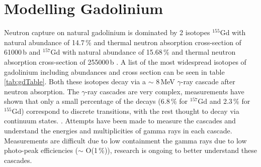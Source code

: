 \section{Modelling Gadolinium}\label{sec:GEANT4Simulation_modellingGadolinium}
Neutron capture on natural gadolinium is dominated by 2 isotopes $^{155}$Gd with natural abundance of 14.7\,\% and thermal neutron absorption cross-section of 61000\,b and $^{157}$Gd with natural abundance of 15.68\,\% and thermal neutron absorption cross-section of 255000\,b \cite{Abdushukurov_2010}. A list of the most widespread isotopes of gadolinium including abundances and cross section can be seen in table \ref{tab:gdTable}. Both these isotopes decay via a $\sim$ 8\,MeV $\gamma$-ray cascade after neutron absorption. The $\gamma$-ray cascades are very complex, measurements have shown that only a small percentage of the decays (6.8\,\% for $^{157}$Gd and 2.3\,\% for $^{155}$Gd) correspond to discrete transitions, with the rest thought to decay via continuum states. \cite{jparc_gdProdNAbsorb_2016}. Attempts have been made to measure the cascades and understand the energies and multiplicities of gamma rays in each cascade. Measurements are difficult due to low containment the gamma rays due to low photo-peak efficiencies ($\sim$ O(1\,\%)), research is ongoing to better understand these cascades.

